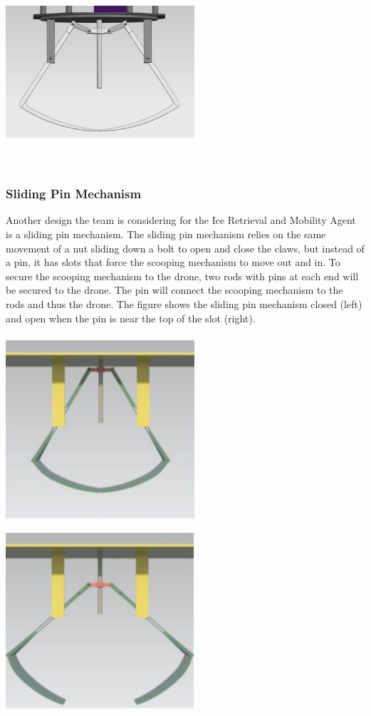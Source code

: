 			\includegraphics[width = 7cm, height = 7cm]{img/PL/pin1.PNG}

		\subsubsection{Sliding Pin Mechanism}
			Another design the team is considering for the Ice Retrieval and Mobility Agent is a sliding pin mechanism. The sliding pin mechanism relies on the same movement of a nut sliding down a bolt to open and close the claws, but instead of a pin, it has slots that force the scooping mechanism to move out and in. To secure the scooping mechanism to the drone, two rods with pins at each end will be secured to the drone. The pin will connect the scooping mechanism to the rods and thus the drone. The figure shows the sliding pin mechanism closed (left) and open when the pin is near the top of the slot (right). 

			\includegraphics[width = 7cm, height = 7cm]{img/PL/slide2.PNG}
			\includegraphics[width = 7cm, height = 7cm]{img/PL/slide1.PNG}

